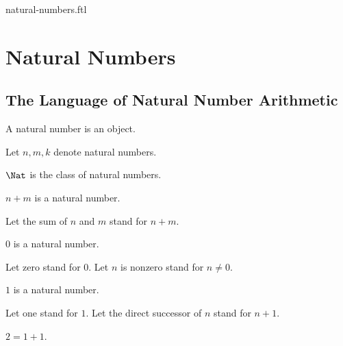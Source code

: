 \documentclass{naproche-library}
\begin{document}
\begin{smodule}{natural-numbers.ftl}


  \section{Natural Numbers}

  \subsection{The Language of Natural Number Arithmetic}

  \begin{signature}[forthel,id=NatNumberSig]
    A natural number is an object.

    Let $n,m,k$ denote natural numbers.
  \end{signature}

  \begin{definition}[forthel,id=NatDef]
    $\Nat$ is the class of natural numbers.
  \end{definition}

  \begin{signature}[forthel,id=PlusSig]
    $n\plus m$ is a natural number.

    Let the sum of $n$ and $m$ stand for $n\plus m$.
  \end{signature}


  \begin{signature}[forthel,id=ZeroSig]
    $0$ is a natural number.

    Let zero stand for $0$.
    Let $n$ is nonzero stand for $n\neq0$.
  \end{signature}

  \begin{signature}[forthel,id=OneSig]
    $1$ is a natural number.

    Let one stand for $1$.
    Let the direct successor of $n$ stand for $n\plus1$.
  \end{signature}

  \begin{definition}[forthel,id=TwoSig]
    $2=1\plus1$.


\end{definition}
\end{smodule}
\end{document}
